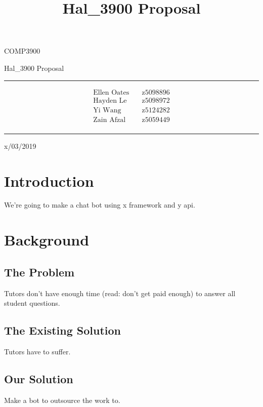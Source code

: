 \documentclass{article}
\title{Hal\_3900 Proposal}
\begin{document}
\begin{LARGE}
\begin{center}
\vspace*{15mm}

COMP3900

Hal\_3900 Proposal

\rule[4.5pt]{0.61\textwidth}{0.3pt}

\begin{align*}
  \text{Ellen Oates}    \quad   &\text{z5098896} \\
  \text{Hayden Le}      \quad   &\text{z5098972} \\
  \text{Yi Wang}        \quad   &\text{z5124282} \\
  \text{Zain Afzal}     \quad   &\text{z5059449} \\
\end{align*}

\rule[4.5pt]{0.61\textwidth}{0.3pt}

x/03/2019

\end{center}
\end{LARGE}
\newpage


\section{Introduction}
We're going to make a chat bot using x framework and y api.

\section{Background}
\subsection{The Problem}
Tutors don't have enough time (read: don't get paid enough) to answer all student questions.

\subsection{The Existing Solution}
Tutors have to suffer.


\subsection{Our Solution}
Make a bot to outsource the work to.
\end{document}
